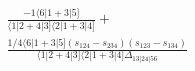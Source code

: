 \documentclass[varwidth, border=5pt]{standalone}
\begin{document}
\begin{my}
$\begin{gathered}
\scriptscriptstyle\frac{-1⟨6|1+3|5]}{⟨1|2+4|3]⟨2|1+3|4]}+\\
\scriptscriptstyle\frac{1/4⟨6|1+3|5](s_{124}-s_{234})(s_{123}-s_{134})}{⟨1|2+4|3]⟨2|1+3|4]Δ_{13|24|56}}\phantom{+}
\end{gathered}$
\end{my}
\end{document}
